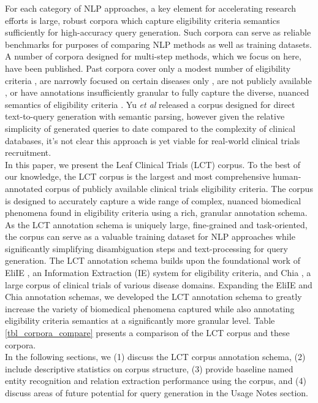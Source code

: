 \documentclass[fleqn,10pt]{wlscirep}
\begin{document}
\noindent For each category of NLP approaches, a key element for accelerating research efforts is large, robust corpora which capture eligibility criteria semantics sufficiently for high-accuracy query generation. Such corpora can serve as reliable benchmarks for purposes of comparing NLP methods as well as training datasets. A number of corpora designed for multi-step methods, which we focus on here, have been published. Past corpora cover only a modest number of eligibility criteria \cite{weng2011elixr}, are narrowly focused on certain diseases only \cite{kang2017eliie}, are not publicly available \cite{tu2011, milian2015enhancing}, or have annotations insufficiently granular to fully capture the diverse, nuanced semantics of eligibility criteria \cite{kury2020chia}. Yu \textit{et al} \cite{yu2020} released a corpus designed for direct text-to-query generation with semantic parsing, however given the relative simplicity of generated queries to date compared to the complexity of clinical databases, it's not clear this approach is yet viable for real-world clinical trials recruitment.  \\

\noindent In this paper, we present the Leaf Clinical Trials (LCT) corpus. To the best of our knowledge, the LCT corpus is the largest and most comprehensive human-annotated corpus of publicly available clinical trials eligibility criteria. The corpus is designed to accurately capture a wide range of complex, nuanced biomedical phenomena found in eligibility criteria using a rich, granular annotation schema. As the LCT annotation schema is uniquely large, fine-grained and task-oriented, the corpus can serve as a valuable training dataset for NLP approaches while significantly simplifying disambiguation steps and text-processing for query generation. The LCT annotation schema builds upon the foundational work of EliIE \cite{kang2017eliie}, an Information Extraction (IE) system for eligibility criteria, and Chia \cite{kury2020chia}, a large corpus of clinical trials of various disease domains. Expanding the EliIE and Chia annotation schemas, we developed the LCT annotation schema to greatly increase the variety of biomedical phenomena captured while also annotating eligibility criteria semantics at a significantly more granular level. Table \ref{tbl_corpora_compare} presents a comparison of the LCT corpus and these corpora. \\

\noindent In the following sections, we (1) discuss the LCT corpus annotation schema, (2) include descriptive statistics on corpus structure, (3) provide baseline named entity recognition and relation extraction performance using the corpus, and (4) discuss areas of future potential for query generation in the Usage Notes section.
\end{document}
